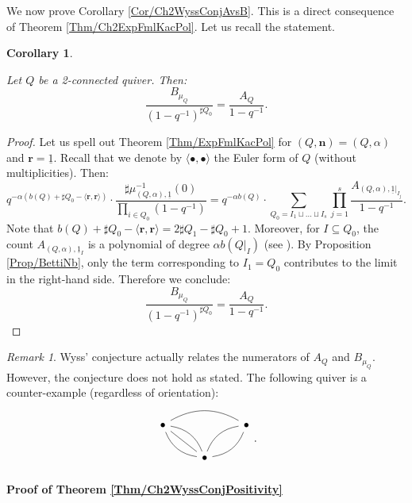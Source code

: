 \documentclass[11pt,english]{article}
\numberwithin{equation}{section}
\numberwithin{figure}{section}
\theoremstyle{definition}
\theoremstyle{plain}
\newtheorem{cor}[df]{Corollary}
\theoremstyle{remark}
\newtheorem{rmk}[df]{Remark}
\newcommand\nn{\mathbf{n}}
\newcommand\rr{\mathbf{r}}
\begin{document}
We now prove Corollary \ref{Cor/Ch2WyssConjAvsB}. This is a direct
consequence of Theorem \ref{Thm/Ch2ExpFmlKacPol}. Let us recall the
statement.

\begin{cor} \label{Cor/WyssConjAvsB}

Let $Q$ be a 2-connected quiver. Then: \[
\frac{B_{\mu_{Q}}}{(1-q^{-1})^{\sharp Q_0}}=\frac{A_{Q}}{1-q^{-1}}.
\]

\end{cor}

\begin{proof}

Let us spell out Theorem \ref{Thm/ExpFmlKacPol} for $(Q,\nn)=(Q,\alpha)$
and $\rr=\underline{1}$. Recall that we denote by $\langle\bullet,\bullet\rangle$
the Euler form of $Q$ (without multiplicities). Then:\[
q^{-\alpha(b(Q)+\sharp Q_0-\langle\rr,\rr\rangle)}
\cdot
\frac{\sharp\mu_{(Q,\alpha),\underline{1}}^{-1}(0)}{\prod_{i\in Q_0}(1-q^{-1})}
=
q^{-\alpha b(Q)}\cdot\sum_{Q_0=I_1\sqcup\ldots\sqcup I_s}\prod_{j=1}^s\frac{A_{(Q,\alpha),\underline{1}\vert_{I_j}}}{1-q^{-1}}.
\] Note that $b(Q)+\sharp Q_{0}-\langle\rr,\rr\rangle=2\sharp Q_{1}-\sharp Q_{0}+1$.
Moreover, for $I\subseteq Q_{0}$, the count $A_{(Q,\alpha),\underline{1}_{I}}$
is a polynomial of degree $\alpha b(Q\vert_{I})$ (see \cite[Cor. 4.35.]{Wys17b}).
By Proposition \ref{Prop/BettiNb}, only the term corresponding to
$I_{1}=Q_{0}$ contributes to the limit in the right-hand side. Therefore
we conclude:\[
\frac{B_{\mu_{Q}}}{(1-q^{-1})^{\sharp Q_0}}=\frac{A_{Q}}{1-q^{-1}}.
\] \end{proof}

\begin{rmk}

Wyss' conjecture actually relates the numerators of $A_{Q}$ and $B_{\mu_{Q}}$.
However, the conjecture does not hold as stated. The following quiver
is a counter-example (regardless of orientation):\[
\begin{tikzcd}[ampersand replacement=\&]
\bullet \ar[rr, dash, bend left] \& \& \bullet \ar[dl, dash, bend left]\ar[dl, dash, bend right] \\
\& \bullet \ar[ul, dash]\ar[ul, dash, bend left]\ar[ul, dash, bend right] \& 
\end{tikzcd}
.
\]

\end{rmk}

\paragraph*{Proof of Theorem \ref{Thm/Ch2WyssConjPositivity}}
\end{document}
